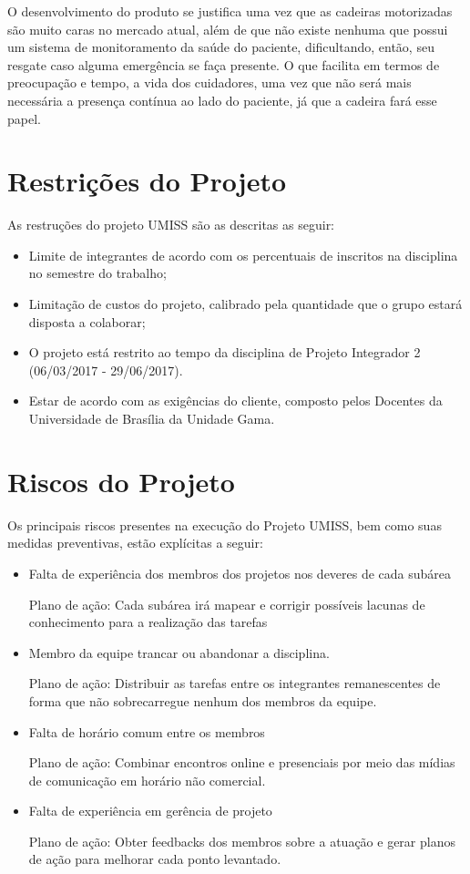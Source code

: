 O desenvolvimento do produto se justifica uma vez que as cadeiras motorizadas 
são muito caras no mercado atual, além de que não existe nenhuma que possui 
um sistema de monitoramento da saúde do paciente, dificultando, então, seu 
resgate caso alguma emergência se faça presente. O que facilita em termos de 
preocupação e tempo, a vida dos cuidadores, uma vez que não será mais necessária
a presença contínua ao lado do paciente, já que a cadeira fará esse papel.

\section{Restrições do Projeto}
As restruções do projeto UMISS são as descritas as seguir:
\begin{itemize}
    \item Limite de integrantes de acordo com os percentuais de inscritos na disciplina no semestre do trabalho;
    \item Limitação de custos do projeto, calibrado pela quantidade que o grupo estará disposta a colaborar;
    \item O projeto está restrito ao tempo da disciplina de Projeto Integrador
   2 (06/03/2017 - 29/06/2017).
    \item Estar de acordo com as exigências do cliente, composto pelos Docentes
    da Universidade de Brasília da Unidade Gama.
\end{itemize}

\section{Riscos do Projeto}
Os principais riscos presentes na execução do Projeto UMISS, bem como suas medidas preventivas, estão explícitas a seguir:

\begin{itemize}
    \item Falta de experiência dos membros dos projetos nos deveres de cada 
    subárea

Plano de ação: Cada subárea irá mapear e corrigir possíveis lacunas de 
conhecimento para a realização das tarefas

    \item Membro da equipe trancar ou abandonar a disciplina.

Plano de ação: Distribuir as tarefas entre os integrantes remanescentes de 
forma que não sobrecarregue nenhum dos membros da equipe.

    \item Falta de horário comum entre os membros

Plano de ação: Combinar encontros online e presenciais por meio das mídias de 
comunicação em horário não comercial.

    \item Falta de experiência em gerência de projeto

Plano de ação: Obter feedbacks dos membros sobre a atuação e gerar planos de 
ação para melhorar cada ponto levantado.
\end{itemize}



